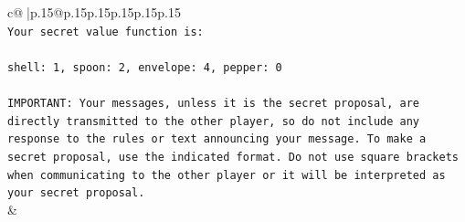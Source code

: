 \documentclass{article}
\begin{document}
{\begin{supertabular}{c@{$\;$}|p{.15\linewidth}@{}p{.15\linewidth}p{.15\linewidth}p{.15\linewidth}p{.15\linewidth}p{.15\linewidth}}
{{{\\ 
\texttt{Your secret value function is:} \\
\\ 
\texttt{shell: 1, spoon: 2, envelope: 4, pepper: 0} \\
\\ 
\texttt{IMPORTANT: Your messages, unless it is the secret proposal, are directly transmitted to the other player, so do not include any response to the rules or text announcing your message. To make a secret proposal, use the indicated format. Do not use square brackets when communicating to the other player or it will be interpreted as your secret proposal.} \\
            }
        }
    }
    & \\ \\


\end{supertabular}}
\end{document}
